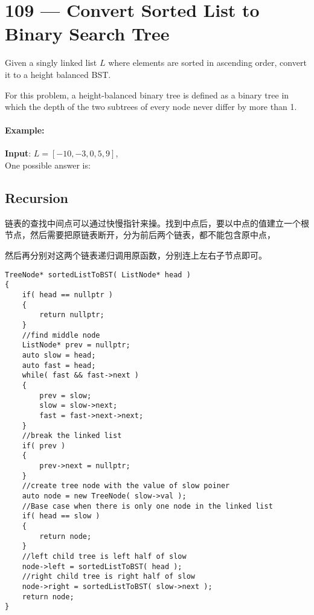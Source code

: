 \section{109 --- Convert Sorted List to Binary Search Tree}
Given a singly linked list $L$ where elements are sorted in ascending order, convert it to a height balanced BST.
\par
For this problem, a height-balanced binary tree is defined as a binary tree in which the depth of the two subtrees of every node never differ by more than 1.
\paragraph{Example:}
\begin{flushleft}
\textbf{Input}: $L = [-10,-3,0,5,9]$,
\\
One possible answer is:
\begin{figure}[H]
\end{figure}
\end{flushleft}
\subsection{Recursion}
链表的查找中间点可以通过快慢指针来操。找到中点后，要以中点的值建立一个根节点，然后需要把原链表断开，分为前后两个链表，都不能包含原中点，

然后再分别对这两个链表递归调用原函数，分别连上左右子节点即可。
\setcounter{lstlisting}{0}
\begin{lstlisting}[style=customc, caption={Recursion}]
TreeNode* sortedListToBST( ListNode* head )
{
    if( head == nullptr )
    {
        return nullptr;
    }
    //find middle node
    ListNode* prev = nullptr;
    auto slow = head;
    auto fast = head;
    while( fast && fast->next )
    {
        prev = slow;
        slow = slow->next;
        fast = fast->next->next;
    }
    //break the linked list
    if( prev )
    {
        prev->next = nullptr;
    }
    //create tree node with the value of slow poiner
    auto node = new TreeNode( slow->val );
    //Base case when there is only one node in the linked list
    if( head == slow )
    {
        return node;
    }
    //left child tree is left half of slow
    node->left = sortedListToBST( head );
    //right child tree is right half of slow
    node->right = sortedListToBST( slow->next );
    return node;
}
\end{lstlisting}

